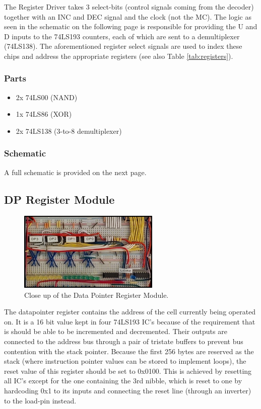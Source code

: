 The Register Driver takes 3 select-bits (control signals coming from the decoder) together with an INC and DEC signal and the clock (not the MC). The logic as seen in the schematic on the following page is responsible for providing the U and D inputs to the 74LS193 counters, each of which are sent to a demultiplexer (74LS138). The aforementioned register select signals are used to index these chips and address the appropriate registers (see also Table \ref{tab:registers}).

\subsubsection*{Parts}
\begin{itemize}\itemsep0em
\item 2x 74LS00 (NAND)
\item 1x 74LS86 (XOR)
\item 2x 74LS138 (3-to-8 demultiplexer)
\end{itemize}

\subsubsection*{Schematic}
A full schematic is provided on the next page.



\subsection{DP Register Module}
\begin{figure}[H]
  \centering
  \includegraphics[width=0.6\textwidth]{img/dpregcloseup}
  \caption{Close up of the Data Pointer Register Module.}
  \label{fig:dpregcloseup}
\end{figure}

The datapointer register contains the address of the cell currently being operated on. It is a 16 bit value kept in four 74LS193 IC's because of the requirement that is should be able to be incremented and decremented. Their outputs are connected to the address bus through a pair of tristate buffers to prevent bus contention with the stack pointer. Because the first 256 bytes are reserved as the stack (where instruction pointer values can be stored to implement loops), the reset value of this register should be set to 0x0100. This is achieved by resetting all IC's except for the one containing the 3rd nibble, which is reset to one by hardcoding 0x1 to its inputs and connecting the reset line (through an inverter) to the load-pin instead.

